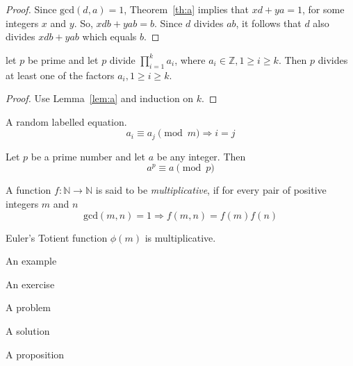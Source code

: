 \begin{proof}
Since $\mathrm{gcd}(d,a)=1$, Theorem~\ref{th:a} implies that $xd + ya = 1$, for some integers $x$ and $y$.
So, $xdb + yab = b$. Since $d$ divides $ab$, it follows that $d$ also divides $xdb + yab$ which equals $b$.
\end{proof}

\begin{corollary}
let $p$ be prime and let $p$ divide $\prod_{i=1}^{k}a_{i}$, where $a_{i}\in\mathbb{Z}, 1\geq i\geq k$. Then $p$ divides at least one of the factors $a_{i}, 1\geq i\geq k$.
\end{corollary}

\begin{proof}
Use Lemma~\ref{lem:a} and induction on $k$.
\end{proof}

\noindent
A random labelled equation.
\begin{equation}\label{eq:a}
a_{i}\equiv a_{j} \pmod{m}\Rightarrow i=j
\end{equation}

\begin{theorem}
Let $p$ be a prime number and let $a$ be any integer. Then
\[
a^{p}\equiv a\pmod{p}
\]
\end{theorem}

\begin{definition}
A function $f:\mathbb{N}\rightarrow\mathbb{N}$ is said to be \emph{multiplicative}, if for every pair of positive integers $m$ and $n$
\[
\mathrm{gcd}(m,n)=1\Rightarrow f(m,n)=f(m)f(n)
\]
\end{definition}

\begin{lemma}
Euler's Totient function $\phi(m)$ is multiplicative.
\end{lemma}

\begin{example}
An example
\end{example}

\begin{exercise}
An exercise
\end{exercise}

\begin{problem}
A problem
\end{problem}

\begin{solution}
A solution
\end{solution}

\begin{proposition}
A proposition
\end{proposition}


